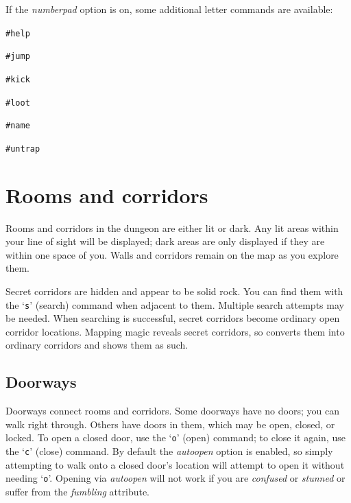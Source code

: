 \documentclass[titlepage]{article}
\begin{document}
\noindent If the \textit{number\textunderscore pad} option is on, some additional letter commands
are available:
\begin{description}[font=\mdseries\ttfamily]
\item[h]
{\tt\#help}
\item[j]
{\tt\#jump}
\item[k]
{\tt\#kick}
\item[l]
{\tt\#loot}
\item[N]
{\tt\#name}
\item[u]
{\tt\#untrap}
\end{description}


\section{Rooms and corridors}

Rooms and corridors in the dungeon are either lit or dark.
Any lit areas within your line of sight will be displayed;
dark areas are only displayed if they are within one space of you.
Walls and corridors remain on the map as you explore them.

Secret corridors are hidden and appear to be solid rock.
You can find them with the `\texttt{s}' (search) command when adjacent
to them.
Multiple search attempts may be needed.
When searching is successful, secret corridors become ordinary open
corridor locations.
Mapping magic reveals secret corridors, so converts them into ordinary
corridors and shows them as such.

\subsection*{Doorways}

Doorways connect rooms and corridors.
Some doorways have no doors; you can walk right through.
Others have doors in them, which may be open, closed, or locked.
To open a closed door, use the `\texttt{o}' (open)
command; to close it again, use the `\texttt{c}' (close) command.
By default the
\textit{autoopen}
option is enabled, so simply attempting to walk onto a closed door's
location will attempt to open it without needing `\texttt{o}'.
Opening via
\textit{autoopen}
will not work if you are \textit{confused} or \textit{stunned} or suffer from
the \textit{fumbling} attribute.
\end{document}
